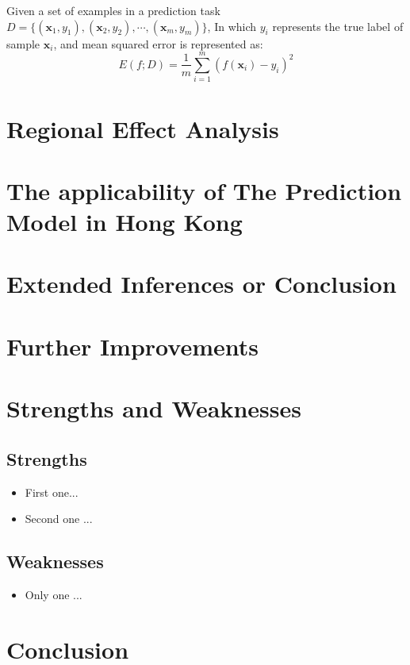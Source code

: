 \documentclass[12pt]{article}  %
\begin{document}
Given a set of examples in a prediction task $D=\{(\textbf{x}_1,y_1),(\textbf{x}_2,y_2) ,\cdots,(\textbf{x}_m,y_m)  \}$, 
In which $y_i$ represents the true label of sample $\textbf{x}_i$, 
and mean squared error is represented as:
$$E(f;D)=\frac{1}{m}\sum_{i=1}^{m}(f(\textbf{x}_i)-y_i)^2$$


\section{Regional Effect Analysis}

\section{The applicability of The Prediction Model in Hong Kong}

\section{Extended Inferences or Conclusion}

\section{Further Improvements}

\section{Strengths and Weaknesses}
\subsection{Strengths}
\begin{itemize}
    \item First one...
    \item Second one ...
\end{itemize}

\subsection{Weaknesses}
\begin{itemize}
    \item Only one ...
 \end{itemize}

\section{Conclusion}
\end{document}
